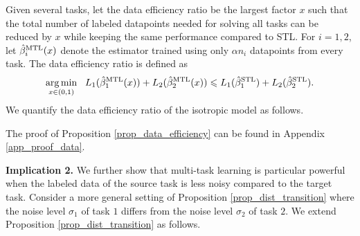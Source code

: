 Given several tasks, let the data efficiency ratio be the largest factor $x$ such that the total number of labeled datapoints needed for solving all tasks can be reduced by $x$ while keeping the same performance compared to STL.
For $i = 1, 2$, let $\hat{\beta}_i^{\text{MTL}}(x)$ denote the estimator trained using only $\alpha n_i$ datapoints from every task.
The data efficiency ratio is defined as
\[ \operatorname*{arg\,min}_{x\in(0, 1)} ~~
		L_1(\hat{\beta}_1^{\text{MTL}}(x)) + L_2(\hat{\beta}_2^{\text{MTL}}(x))
		\leqslant L_1(\hat{\beta}_1^{\text{STL}}) + L_2(\hat{\beta}_2^{\text{STL}}). \]
We quantify the data efficiency ratio of the isotropic model as follows.

The proof of Proposition \ref{prop_data_efficiency} can be found in Appendix \ref{app_proof_data}.

\textbf{Implication 2.}
We further show that multi-task learning is particular powerful when the labeled data of the source task is less noisy compared to the target task.
Consider a more general setting of Proposition \ref{prop_dist_transition} where the noise level $\sigma_1$ of task $1$ differs from the noise level $\sigma_2$ of task $2$.
We extend Proposition \ref{prop_dist_transition} as follows.


